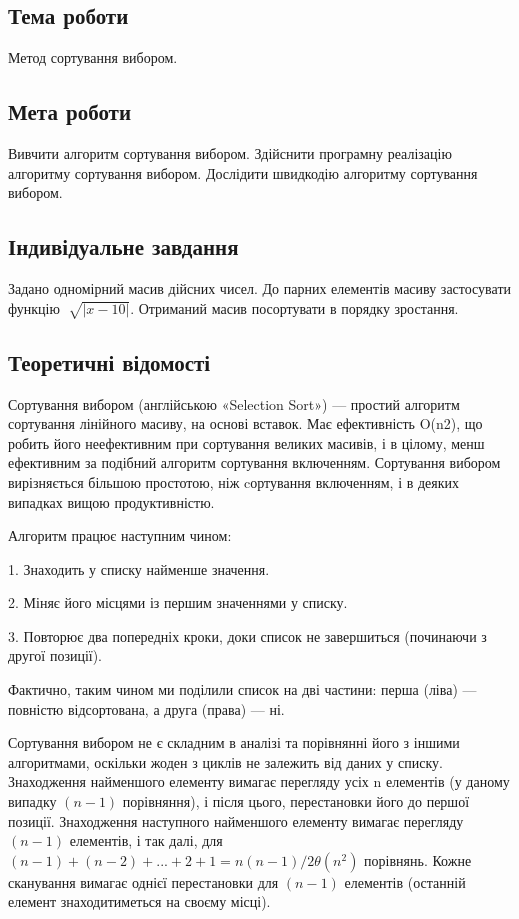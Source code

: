 \documentclass[12pt]{extarticle}
\begin{document}
\subsection*{Тема роботи} 
Метод сортування вибором.

\subsection*{Мета роботи} Вивчити алгоритм сортування вибором. 
Здійснити програмну реалізацію алгоритму сортування вибором.
 Дослідити швидкодію алгоритму сортування вибором.

\subsection*{Індивідуальне завдання}
Задано одномірний масив дійсних чисел. До парних елементів масиву застосувати функцію \space $\sqrt[]{|x -10|}$. Отриманий масив посортувати в порядку зростання.

\subsection*{Теоретичні відомості}
Сортування вибором (англійською «Selection Sort») — простий алгоритм сортування лінійного масиву, на основі вставок. Має ефективність O(n2), що робить його неефективним при сортування великих масивів, і в цілому, менш ефективним за подібний алгоритм сортування включенням. Сортування вибором вирізняється більшою простотою, ніж cортування включенням, і в деяких випадках вищою продуктивністю.

Алгоритм працює наступним чином:

1.     Знаходить у списку найменше значення.

2.     Міняє його місцями із першим значеннями у списку.

3.     Повторює два попередніх кроки, доки список не завершиться (починаючи з другої позиції).

Фактично, таким чином ми поділили список на дві частини: перша (ліва) — повністю відсортована, а друга (права) — ні.

Сортування вибором не є складним в аналізі та порівнянні його з іншими алгоритмами,
 оскільки жоден з циклів не залежить від даних у списку. 
 Знаходження найменшого елементу вимагає перегляду усіх n 
елементів (у даному випадку $(n - 1)$ порівняння), і після цього, 
перестановки його до першої позиції. Знаходження наступного найменшого 
елементу вимагає перегляду $(n - 1)$ елементів, і так далі, для 
$(n - 1) + (n - 2) + ... + 2 + 1 = n(n - 1) / 2 \theta(n^2)$ порівнянь. Кожне сканування 
вимагає однієї перестановки для $(n - 1)$ елементів (останній елемент знаходитиметься на своєму місці).
\end{document}
